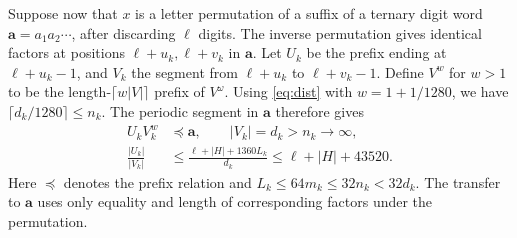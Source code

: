 Suppose now that \(x\) is a letter permutation of a suffix of a
ternary digit word \(\mathbf a=a_1a_2\cdots\), after discarding
\(\ell\) digits. The inverse permutation gives identical factors
at positions \(\ell+u_k,\ell+v_k\) in \(\mathbf a\). Let \(U_k\) be
the prefix ending at \(\ell+u_k-1\), and \(V_k\) the segment from
\(\ell+u_k\) to \(\ell+v_k-1\). Define \(V^w\) for \(w>1\) to be the
length-\(\lceil w|V|\rceil\) prefix of \(V^\omega\). Using
\eqref{eq:dist} with \(w=1+1/1280\), we have
\(\lceil d_k/1280\rceil\le n_k\).
The periodic segment in \(\mathbf a\) therefore gives
\begin{equation}\label{eq:abl}
\begin{aligned}
U_kV_k^w &\preceq \mathbf a,\qquad
          |V_k|=d_k>n_k\longrightarrow\infty,\\
\frac{|U_k|}{|V_k|}
&\le \frac{\ell+|H|+1360L_k}{d_k}
 \le \ell+|H|+43520.
\end{aligned}
\end{equation}
Here \(\preceq\) denotes the prefix relation and
\(L_k\le64m_k\le32n_k<32d_k\).
The transfer to \(\mathbf a\) uses only equality and length of
corresponding factors under the permutation.

